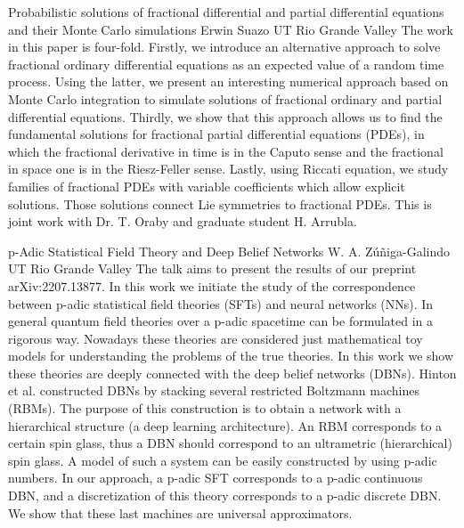 \vspace{1.5ex}
\abs
{Probabilistic solutions of fractional differential and partial differential equations and their Monte Carlo simulations}
{Erwin Suazo}
{UT Rio Grande Valley}
{The work in this paper is four-fold. Firstly, we introduce an alternative approach to solve fractional ordinary differential equations as an expected value of a random time process. Using the latter, we present an interesting numerical approach based on Monte Carlo integration to simulate solutions of fractional ordinary and partial differential equations. Thirdly, we show that this approach allows us to find the fundamental solutions for fractional partial differential equations (PDEs), in which the fractional derivative in time is in the Caputo sense and the fractional in space one is in the Riesz-Feller sense. Lastly, using Riccati equation, we study families of fractional PDEs with variable coefficients which allow explicit solutions. Those solutions connect Lie symmetries to fractional PDEs. This is joint work with Dr. T. Oraby and graduate student H. Arrubla.}


\vspace{1.5ex}
\abs
{p-Adic Statistical Field Theory and Deep Belief Networks}
{W. A. Zúñiga-Galindo }
{UT Rio Grande Valley}
{The talk aims to present the results of our preprint arXiv:2207.13877. In this work we initiate the study of the correspondence between p-adic statistical field theories (SFTs) and neural networks (NNs). In general quantum field theories over a p-adic spacetime can be formulated in a rigorous way. Nowadays these theories are considered just mathematical toy models for understanding the problems of the true theories. In this work we show these theories are deeply connected with the deep belief networks (DBNs). Hinton et al. constructed DBNs by stacking several restricted Boltzmann machines (RBMs). The purpose of this construction is to obtain a network with a hierarchical structure (a deep learning architecture). An RBM corresponds to a certain spin glass, thus a DBN should correspond to an ultrametric (hierarchical) spin glass. A model of such a system can be easily constructed by using p-adic numbers. In our approach, a p-adic SFT corresponds to a p-adic continuous DBN, and a discretization of this theory corresponds to a p-adic discrete DBN. We show that these last machines are universal approximators.}


